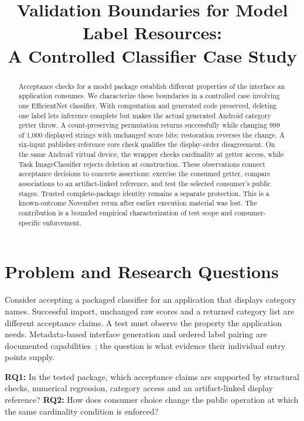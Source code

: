 \documentclass[10pt,conference]{IEEEtran}
\title{Validation Boundaries for Model Label Resources:\\A Controlled Classifier Case Study}
\author{\IEEEauthorblockN{Anonymous author(s)}}
\begin{document}
\maketitle

\begin{abstract}
Acceptance checks for a model package establish different properties of the interface an application consumes. We characterize these boundaries in a controlled case involving one EfficientNet classifier. With computation and generated code preserved, deleting one label lets inference complete but makes the actual generated Android category getter throw. A count-preserving permutation returns successfully while changing 999 of 1,000 displayed strings with unchanged score bits; restoration reverses the change. A six-input publisher-reference core check qualifies the display-order disagreement. On the same Android virtual device, the wrapper checks cardinality at getter access, while Task ImageClassifier rejects deletion at construction. These observations connect acceptance decisions to concrete assertions: exercise the consumed getter, compare associations to an artifact-linked reference, and test the selected consumer's public stages. Trusted complete-package identity remains a separate protection. This is a known-outcome November rerun after earlier execution material was lost. The contribution is a bounded empirical characterization of test scope and consumer-specific enforcement.
\end{abstract}

\section{Problem and Research Questions}
\label{sec:contracts}
Consider accepting a packaged classifier for an application that displays category names. Successful import, unchanged raw scores and a returned category list are different acceptance claims. A test must observe the property the application needs. Metadata-based interface generation and ordered label pairing are documented capabilities~\cite{schema,codegen-doc,tensorlabel}; the question is what evidence their individual entry points supply.

\textbf{RQ1:} In the tested package, which acceptance claims are supported by structural checks, numerical regression, category access and an artifact-linked display reference? \textbf{RQ2:} How does consumer choice change the public operation at which the same cardinality condition is enforced?
\end{document}
